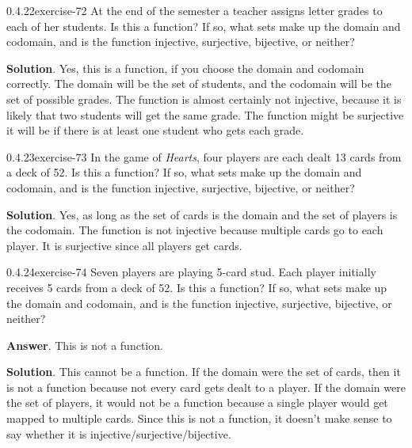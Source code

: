 \documentclass[twoside,11pt,]{book}
\numberwithin{equation}{chapter}
\begin{document}
\begin{divisionsolution}{0.4.22}{}{exercise-72}%
\hypertarget{p-1143}{}%
At the end of the semester a teacher assigns letter grades to each of her students. Is this a function? If so, what sets make up the domain and codomain, and is the function injective, surjective, bijective, or neither?%
\par\smallskip%
\noindent\textbf{Solution}.\quad%
\hypertarget{p-1144}{}%
Yes, this is a function, if you choose the domain and codomain correctly. The domain will be the set of students, and the codomain will be the set of possible grades. The function is almost certainly not injective, because it is likely that two students will get the same grade. The function might be surjective \textendash{} it will be if there is at least one student who gets each grade.%
\end{divisionsolution}%
\begin{divisionsolution}{0.4.23}{}{exercise-73}%
\hypertarget{p-1145}{}%
In the game of \emph{Hearts}, four players are each dealt 13 cards from a deck of 52. Is this a function? If so, what sets make up the domain and codomain, and is the function injective, surjective, bijective, or neither?%
\par\smallskip%
\noindent\textbf{Solution}.\quad%
\hypertarget{p-1146}{}%
Yes, as long as the set of cards is the domain and the set of players is the codomain. The function is not injective because multiple cards go to each player. It is surjective since all players get cards.%
\end{divisionsolution}%
\begin{divisionsolution}{0.4.24}{}{exercise-74}%
\hypertarget{p-1147}{}%
Seven players are playing 5-card stud. Each player initially receives 5 cards from a deck of 52. Is this a function? If so, what sets make up the domain and codomain, and is the function injective, surjective, bijective, or neither?%
\par\smallskip%
\noindent\textbf{Answer}.\quad%
\hypertarget{p-1148}{}%
This is not a function.%
\par\smallskip%
\noindent\textbf{Solution}.\quad%
\hypertarget{p-1149}{}%
This cannot be a function. If the domain were the set of cards, then it is not a function because not every card gets dealt to a player. If the domain were the set of players, it would not be a function because a single player would get mapped to multiple cards. Since this is not a function, it doesn't make sense to say whether it is injective/surjective/bijective.%
\end{divisionsolution}%
\end{document}
